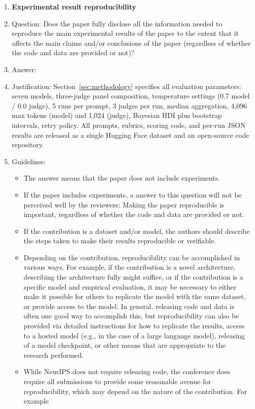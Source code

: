 \begin{enumerate}
    \item {\bf Experimental result reproducibility}
    \item[] Question: Does the paper fully disclose all the information needed to reproduce the main experimental results of the paper to the extent that it affects the main claims and/or conclusions of the paper (regardless of whether the code and data are provided or not)?
    \item[] Answer: \answerYes{}
    \item[] Justification: Section~\ref{sec:methodology} specifies all evaluation parameters: seven models, three-judge panel composition, temperature settings (0.7 model / 0.0 judge), 5 runs per prompt, 3 judges per run, median aggregation, 4{,}096 max tokens (model) and 1{,}024 (judge), Bayesian HDI plus bootstrap intervals, retry policy. All prompts, rubrics, scoring code, and per-run JSON results are released as a single Hugging Face dataset and an open-source code repository.
    \item[] Guidelines:
    \begin{itemize}
        \item The answer \answerNA{} means that the paper does not include experiments.
        \item If the paper includes experiments, a \answerNo{} answer to this question will not be perceived well by the reviewers: Making the paper reproducible is important, regardless of whether the code and data are provided or not.
        \item If the contribution is a dataset and\slash or model, the authors should describe the steps taken to make their results reproducible or verifiable.
        \item Depending on the contribution, reproducibility can be accomplished in various ways. For example, if the contribution is a novel architecture, describing the architecture fully might suffice, or if the contribution is a specific model and empirical evaluation, it may be necessary to either make it possible for others to replicate the model with the same dataset, or provide access to the model. In general. releasing code and data is often one good way to accomplish this, but reproducibility can also be provided via detailed instructions for how to replicate the results, access to a hosted model (e.g., in the case of a large language model), releasing of a model checkpoint, or other means that are appropriate to the research performed.
        \item While NeurIPS does not require releasing code, the conference does require all submissions to provide some reasonable avenue for reproducibility, which may depend on the nature of the contribution. For example

\end{itemize}
\end{enumerate}

